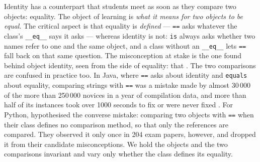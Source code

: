 Identity has a counterpart that students meet as soon as they compare two
objects: equality. The object of learning is \emph{what it means for two
objects to be equal}. The critical aspect is that equality is \emph{defined}
--- \texttt{==} asks whatever the class's
\texttt{__eq__} says it asks --- whereas identity is not:
\texttt{is} always asks whether two names refer to one and the
same object, and a class without an \texttt{__eq__} lets
\texttt{==} fall back on that same question.
The misconception at stake is the one \textcite{Holland1997} found behind
object identity, seen from the side of equality: that
.
The two comparisons are confused in practice too. In Java, where
\texttt{==} asks about identity and \texttt{equals} about
equality, comparing strings with \texttt{==} was a mistake made by
almost 30\,000 of the more than 250\,000 novices in a year of compilation data,
and more than half of its instances took over 1000 seconds to fix or were never
fixed \autocite{AltadmriBrown2015}.
For Python, \textcite{Gama2018PythonAntipatterns} hypothesised the converse
mistake: comparing two objects with \texttt{==} when their class
defines no comparison method, so that only the references are compared. They
observed it only once in 204 exam papers, however, and dropped it from their
candidate misconceptions.
We hold the objects and the two comparisons invariant and vary only whether
the class defines its equality.


